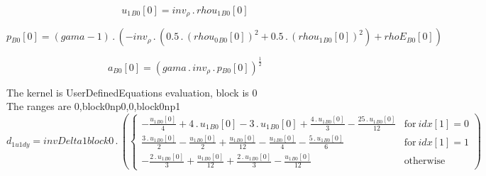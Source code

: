 \documentclass{article}
\begin{document}
\begin{dmath}{u_{1}{_{B0}}}[{0}] = inv_{\rho} \,.\, {rhou_{1}{_{B0}}}[{0}]\end{dmath}

\begin{dmath}{p{_{B0}}}[{0}] = \left(gama - 1\right) \,.\, \left(- inv_{\rho} \,.\, \left(0.5 \,.\, \left({rhou_{0}{_{B0}}}[{0}] \right)^{2} + 0.5 \,.\, \left({rhou_{1}{_{B0}}}[{0}] \right)^{2}\right) + {rhoE{_{B0}}}[{0}]\right)\end{dmath}

\begin{dmath}{a{_{B0}}}[{0}] = \left(gama \,.\, inv_{\rho} \,.\, {p{_{B0}}}[{0}] \right)^{\frac{1}{2}}\end{dmath}

\noindent The kernel is UserDefinedEquations evaluation, block is 0\\\noindent The ranges are 0,block0np0,0,block0np1\\\begin{dmath}d_{1 u1 dy} = invDelta1block0 \,.\, \left(\begin{cases} - \frac{{u_{1}{_{B0}}}[{0}]}{4} + 4 \,.\, {u_{1}{_{B0}}}[{0}] - 3 \,.\, {u_{1}{_{B0}}}[{0}] + \frac{4 \,.\, {u_{1}{_{B0}}}[{0}]}{3} - \frac{25 \,.\, {u_{1}{_{B0}}}[{0}]}{12} & 
\text{for}\: {idx}[{1}] = 0 \\\frac{3 \,.\, {u_{1}{_{B0}}}[{0}]}{2} - \frac{{u_{1}{_{B0}}}[{0}]}{2} + \frac{{u_{1}{_{B0}}}[{0}]}{12} - \frac{{u_{1}{_{B0}}}[{0}]}{4} - \frac{5 \,.\, {u_{1}{_{B0}}}[{0}]}{6} & \text{for}\: {idx}[{1}] = 1 \\- \frac{2 
\,.\, {u_{1}{_{B0}}}[{0}]}{3} + \frac{{u_{1}{_{B0}}}[{0}]}{12} + \frac{2 \,.\, {u_{1}{_{B0}}}[{0}]}{3} - \frac{{u_{1}{_{B0}}}[{0}]}{12} & \text{otherwise} \end{cases}\right)\end{dmath}
\end{document}
